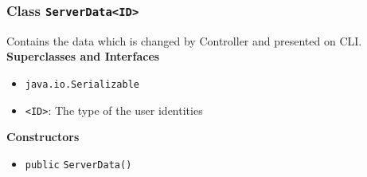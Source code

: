 \subsubsection{Class \lstinline|ServerData<ID>|}
Contains the data which is changed by Controller and presented on CLI. \\


\textbf{Superclasses and Interfaces}
\begin{itemize}
\item \lstinline|java.io.Serializable|
\end{itemize}

\begin{itemize}
\item \lstinline|<ID>|: The type of the user identities
\end{itemize}


\textbf{Constructors}
\begin{itemize}
\item \lstinline|public| \lstinline|ServerData|\lstinline|()|




\end{itemize}


